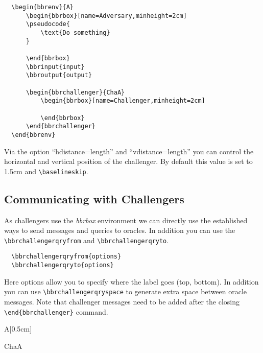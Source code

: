 \documentclass[a4paper]{report}
\begin{document}
  
  \begin{lstlisting}
  \begin{bbrenv}{A}
	  \begin{bbrbox}[name=Adversary,minheight=2cm]
	  \pseudocode{
		  \text{Do something} 
	  }
  
	  \end{bbrbox}
	  \bbrinput{input}
	  \bbroutput{output}
  
	  \begin{bbrchallenger}{ChaA}
		  \begin{bbrbox}[name=Challenger,minheight=2cm]
		  
		  \end{bbrbox}
	  \end{bbrchallenger}
  \end{bbrenv}
  \end{lstlisting}
  Via the option \enquote{hdistance=length} and \enquote{vdistance=length} you can control the horizontal and vertical position of the challenger. By default this value is set to 1.5cm and \lstinline$\baselineskip$.
  
  
  \subsection{Communicating with Challengers}
  As challengers use the \emph{bbrbox} environment we can directly use the established ways to send messages and
  queries to oracles. In addition you can use the \lstinline$\bbrchallengerqryfrom$ and \lstinline$\bbrchallengerqryto$.
  \begin{lstlisting}
  \bbrchallengerqryfrom{options}
  \bbrchallengerqryto{options}
  \end{lstlisting}
  Here options allow you to specify where the label goes (top, bottom). In addition you can use
  \lstinline$\bbrchallengerqryspace$ to generate extra space between oracle messages. Note
  that challenger messages need to be added after the closing \lstinline$\end{bbrchallenger}$ command.
  
  \vspace{2em}
  \begin{bbrenv}[1cm]{A}[0.5cm]
	  \begin{bbrbox}[name=Adversary,minheight=2cm]
  
	  \end{bbrbox}
  
	  \begin{bbrchallenger}{ChaA}
		  \begin{bbrbox}[name=Challenger,minheight=2cm]
		  
		  \end{bbrbox}
	  \end{bbrchallenger}
  
  \end{bbrenv}
  
\end{document}
